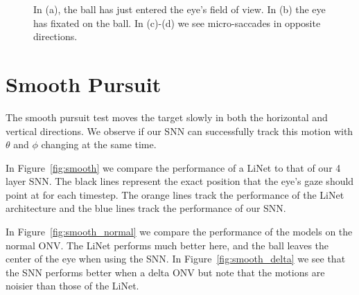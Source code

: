 \documentclass [MS] {UCLAthesis}
\begin{document}
\begin{figure}
\begin{subfigure}[b]{0.20\textwidth}
        \caption{}
    \end{subfigure}
    \caption[Fixation simulation with a SNN]{In (a), the ball has just entered the eye's field of view. In (b) the eye has fixated on the ball. In (c)-(d) we see micro-saccades in opposite directions.}
    \label{fig:fixation}
\end{figure}


\section{Smooth Pursuit}

The smooth pursuit test moves the target slowly in both the horizontal and vertical directions. We observe if our SNN can successfully track this motion with $\theta$ and $\phi$ changing at the same time.

In Figure~\ref{fig:smooth} we compare the performance of a LiNet to that of our 4 layer SNN. The black lines represent the exact position that the eye's gaze should point at for each timestep. The orange lines track the performance of the LiNet architecture and the blue lines track the performance of our SNN. 

In Figure~\ref{fig:smooth_normal} we compare the performance of the models on the normal ONV. The LiNet performs much better here, and the ball leaves the center of the eye when using the SNN. In Figure~\ref{fig:smooth_delta} we see that the SNN performs better when a delta ONV but note that the motions are noisier than those of the LiNet. 
\end{document}
